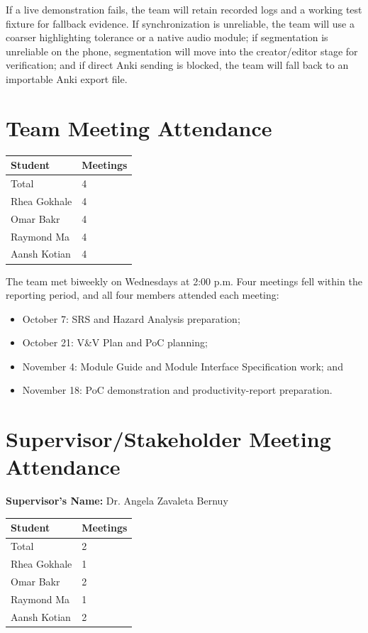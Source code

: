 \documentclass{article}
\begin{document}
If a live demonstration fails, the team will retain recorded logs and a
working test fixture for fallback evidence.  If synchronization is unreliable,
the team will use a coarser highlighting tolerance or a native audio module;
if segmentation is unreliable on the phone, segmentation will move into the
creator/editor stage for verification; and if direct Anki sending is blocked,
the team will fall back to an importable Anki export file.

\section{Team Meeting Attendance}

\begin{table}[H]
\centering
\begin{tabular}{ll}
\toprule
\textbf{Student} & \textbf{Meetings}\\
\midrule
Total & 4\\
Rhea Gokhale & 4\\
Omar Bakr & 4\\
Raymond Ma & 4\\
Aansh Kotian & 4\\
\bottomrule
\end{tabular}
\end{table}

The team met biweekly on Wednesdays at 2:00 p.m.  Four meetings fell within
the reporting period, and all four members attended each meeting:
\begin{itemize}
    \item October 7: SRS and Hazard Analysis preparation;
    \item October 21: V\&V Plan and PoC planning;
    \item November 4: Module Guide and Module Interface Specification work; and
    \item November 18: PoC demonstration and productivity-report preparation.
\end{itemize}

\section{Supervisor/Stakeholder Meeting Attendance}

\noindent \textbf{Supervisor's Name: } Dr. Angela Zavaleta Bernuy

\begin{table}[H]
\centering
\begin{tabular}{ll}
\toprule
\textbf{Student} & \textbf{Meetings}\\
\midrule
Total & 2\\
Rhea Gokhale & 1\\
Omar Bakr & 2\\
Raymond Ma & 1\\
Aansh Kotian & 2\\
\bottomrule
\end{tabular}
\end{table}
\end{document}
